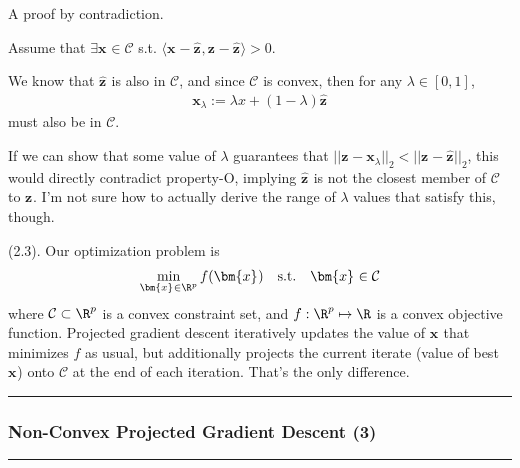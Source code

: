 \documentclass[11pt]{article}
\renewcommand\vec[2][]{\bm{#2}_{#1}}
\newcommand\myspace[1][]{\vspace{#1\bigskipamount}}
\newcommand\p{\Needspace{10\baselineskip} \noindent}
\newcommand\subsub[1]{\Needspace{15\baselineskip}\hrule\subsubsection{#1}\hrule}
\begin{document}
\begin{example}
	A proof by contradiction.
	\begin{compactenum}
		\item Assume that $\exists \vec x \in \mathcal C$ s.t. $ 	\langle \vec x - \hat{\vec z}, \vec z - \hat{\vec z} \rangle > 0$.
		
		\item We know that $\hat{\vec z}$ is also in $\mathcal C$, and since $\mathcal C$ is convex, then for any $\lambda \in [0, 1]$, 
		\begin{align}
			\vec[\lambda]{x} := \lambda x + (1 - \lambda) \hat{\vec z}
		\end{align}
		must also be in $\mathcal C$. 
		
		\item If we can show that some value of $\lambda$ guarantees that $||\vec z - \vec[\lambda]{x}||_2 < ||\vec z - \hat{\vec z}||_2$, this would directly contradict property-O, implying $\hat{\vec z}$ is not the closest member of $\mathcal C$ to $\vec z$. I'm not sure how to actually derive the range of $\lambda$ values that satisfy this, though. 
	\end{compactenum}  
\end{example}



\myspace
\p {} (2.3). Our optimization problem is
\begin{align}
	\min_{\vec x \in \R^p} f(\vec x) \quad\text{s.t.}\quad \vec x \in \mathcal C
\end{align}
where $\mathcal C \subset \R^p$ is a convex constraint set, and $f: \R^p \mapsto \R$ is a convex objective function. Projected gradient descent iteratively updates the value of $\vec x$ that minimizes $f$ as usual, but additionally projects the current iterate (value of best $\vec x$) onto $\mathcal C$ at the end of each iteration. That's the only difference. 



\myspace
\subsub{Non-Convex Projected Gradient Descent (3)}
\myspace
\end{document}
